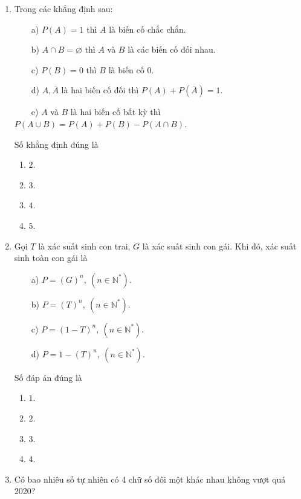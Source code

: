 \begin{enumerate}[label=\textbf{Câu \arabic*.},align=left,left=0cm..0cm,itemindent=*]
\begin{multicols}{4}
\begin{enumerate}[label=\textbf{\Alph*.},align=left,left=1cm..0cm,itemindent=*]
	\end{enumerate}\end{multicols}
	\item Trong các khẳng định sau:\par
	~~~~a) $P(A)=1$ thì $A$ là biến cố chắc chắn.\par
	~~~~b) $A\cap B=\varnothing$ thì $A$ và $B$ là các biến cố đối nhau.\par
	~~~~c) $P(B)=0$ thì $B$ là biến cố 0.\par
	~~~~d) $A,\overline{A}$ là hai biến cố đối thì $P(A)+P\left(\overline{A}\right)=1$.\par
	~~~~e) $A$ và $B$ là hai biến cố bất kỳ thì $P (A\cup B)=P(A)+P(B)-P (A\cap B)$.\par
	Số khẳng định đúng là
	\begin{multicols}{4}\begin{enumerate}[label=\textbf{\Alph*.},align=left,left=1cm..0cm,itemindent=*]
		\item $2$. \item $3$. \item $4$. \item $5$.
	\end{enumerate}\end{multicols}
	\item Gọi $T$ là xác suất sinh con trai, $G$ là xác suất sinh con gái. Khi đó, xác suất sinh toàn con gái là\par
	~~~~a) $P=(G)^n,~(n\in\mathbb{N}^*)$.\par
	~~~~b) $P=(T)^n,~(n\in\mathbb{N}^*)$.\par
	~~~~c) $P=(1-T)^n,~(n\in\mathbb{N}^*)$.\par
	~~~~d) $P=1-(T)^n,~(n\in\mathbb{N}^*)$.\par
	Số đáp án đúng là
	\begin{multicols}{4}\begin{enumerate}[label=\textbf{\Alph*.},align=left,left=1cm..0cm,itemindent=*]
		\item $1$. \item $2$. \item $3$. \item $4$.
	\end{enumerate}\end{multicols}
	\item Có bao nhiêu số tự nhiên có 4 chữ số đôi một khác nhau không vượt quá 2020?
	\begin{multicols}{4}\begin{enumerate}[label=\textbf{\Alph*.},align=left,left=1cm..0cm,itemindent=*]

\end{enumerate}
\end{multicols}
\end{enumerate}
